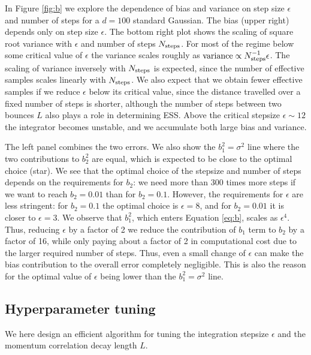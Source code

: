 \documentclass[twoside,11pt]{article}
\begin{document}
In Figure \ref{fig:b} we explore the dependence of bias and variance on step size $\epsilon$ and number of steps  for a $d=100$ standard Gaussian. The bias (upper right) depends only on step size $\epsilon$. 
The bottom right plot shows the scaling of square root variance with $\epsilon$ and number of steps $N_{\rm steps}$. For most of the regime below some critical value of $\epsilon$ the variance scales roughly as ${\rm variance} \propto N_{\rm steps}^{-1}\epsilon $. The scaling of variance inversely with $N_{\rm steps}$ is expected, since the number of effective samples scales linearly with $N_{\rm steps}$. We also expect that we obtain fewer effective samples if we reduce $\epsilon$ below its critical value, since the distance travelled over a fixed number of steps is shorter, although the number of steps between two bounces $L$ also plays a role in determining ESS. Above the critical stepsize $\epsilon \sim 12$ the integrator becomes unstable, and we accumulate both large bias and variance. 

The left panel combines the two errors. We also show the 
 $b_1^2=\sigma^2$ line where the two contributions to 
$b_2^2$ are equal, which is expected to 
be close to the optimal choice (star). We see that 
the optimal choice of the stepsize and number
of steps depends on the requirements for $b_2$: we need more than 300 times more steps if we 
want to reach $b_2=0.01$ than for $b_2=0.1$. However, the requirements for $\epsilon$ are less 
stringent: for $b_2=0.1$ the optimal choice is 
$\epsilon=8$, and for $b_2=0.01$ it is closer 
to $\epsilon=3$. We observe that $b_1^2$, which 
enters Equation \ref{eq:b}, scales as $\epsilon^4$. 
Thus, reducing $\epsilon$ by a factor of 2 
we reduce the contribution of $b_1$ term to $b_2$
by a factor of 16, while only paying about 
a factor of 2 in computational cost due to the larger required 
number of steps. Thus, even a small change of 
$\epsilon$ can make the bias contribution to the 
overall error completely negligible. This is also 
the reason for the optimal value of $\epsilon$ being lower
than the $b_1^2=\sigma^2$ line. 

    


\subsection{Hyperparameter tuning} \label{sec: tuning}

We here design an efficient algorithm for tuning the  integration stepsize $\epsilon$ and the momentum correlation decay length $L$.
\end{document}
